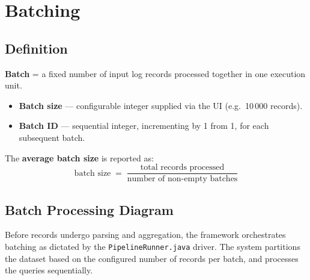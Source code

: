 \documentclass[11pt,a4paper]{article}
\begin{document}
\section{Batching}
\subsection{Definition}

\begin{tcolorbox}[basebox, colback=LightBg, colframe=AccentCyan,
                  title={Batch Definition}]
\textbf{Batch} = a fixed number of input log records processed together in one execution unit.

\begin{itemize}
  \item \textbf{Batch size} --- configurable integer supplied via the UI (e.g.\ 10\,000 records).
  \item \textbf{Batch ID} --- sequential integer, incrementing by 1 from 1, for each subsequent batch.
\end{itemize}
\end{tcolorbox}

The \textbf{average batch size} is reported as:
\[
  {\text{batch size}} \;=\;
  \frac{\text{total records processed}}{\text{number of non-empty batches}}
\]

\subsection{Batch Processing Diagram}
Before records undergo parsing and aggregation, the framework orchestrates batching as dictated by the \texttt{PipelineRunner.java} driver. The system partitions the dataset based on the configured number of records per batch, and processes the queries sequentially.
\end{document}
